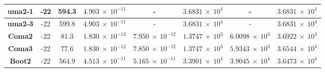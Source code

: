 \documentclass[12pt]{article}
\begin{document}
\begin{table}[H]
{\begin{tabular}{|c|c|c|c|c|c|c|c|}
        \textbf{uma2-1}                                       & -22                                                          & 594.3                                                    & $4.903 \: \times \: 10^{-11}$                                     & -                                                                 & $3.6831 \: \times \: 10^{4}$                                       & -                                                                  & $3.6831 \: \times \: 10^{4}$                                      \\ \hline
        \textbf{uma2-3}                                       & -22                                                          & 599.8                                                    & $4.903 \: \times \: 10^{-11}$                                     & -                                                                 & $3.6831 \: \times \: 10^{4}$                                       & -                                                                  & $3.6831 \: \times \: 10^{4}$                                      \\ \hline
        \textbf{Coma2}                                        & -22                                                          & 81.3                                                     & $1.830 \: \times \: 10^{-12}$                                     & $7.950 \: \times \: 10^{-12}$                                     & $1.3747 \: \times \: 10^{3}$                                       & $6.0098 \: \times \: 10^{3}$                                       & $3.6922 \: \times \: 10^{3}$                                      \\ \hline
        \textbf{Coma3}                                        & -22                                                          & 77.6                                                     & $1.830 \: \times \: 10^{-12}$                                     & $7.850 \: \times \: 10^{-12}$                                     & $1.3747 \: \times \: 10^{3}$                                       & $5.9343 \: \times \: 10^{3}$                                       & $3.6544 \: \times \: 10^{3}$                                      \\ \hline
        \textbf{Boot2}                                        & -22                                                          & 564.9                                                    & $4.513 \: \times \: 10^{-11}$                                     & $5.165 \: \times \: 10^{-11}$                                     & $3.3901 \: \times \: 10^{4}$                                       & $3.9045 \: \times \: 10^{4}$                                       & $3.6473 \: \times \: 10^{4}$                                      \\ \hline

\end{tabular}}
\end{table}
\end{document}
